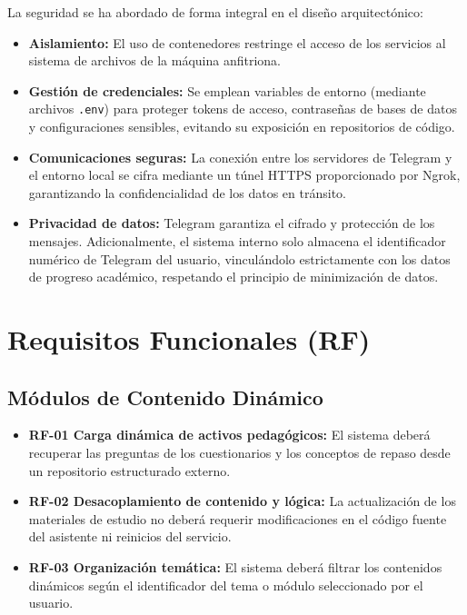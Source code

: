 \documentclass[a4paper,12pt,twoside,final]{book}
\begin{document}
La seguridad se ha abordado de forma integral en el diseño arquitectónico:
\begin{itemize}
    \item \textbf{Aislamiento:} El uso de contenedores restringe el acceso de los servicios al sistema de archivos de la máquina anfitriona.
    \item \textbf{Gestión de credenciales:} Se emplean variables de entorno (mediante archivos \texttt{.env}) para proteger tokens de acceso, contraseñas de bases de datos y configuraciones sensibles, evitando su exposición en repositorios de código.
    \item \textbf{Comunicaciones seguras:} La conexión entre los servidores de Telegram y el entorno local se cifra mediante un túnel HTTPS proporcionado por Ngrok, garantizando la confidencialidad de los datos en tránsito.
    \item \textbf{Privacidad de datos:} Telegram garantiza el cifrado y protección de los mensajes. Adicionalmente, el sistema interno solo almacena el identificador numérico de Telegram del usuario, vinculándolo estrictamente con los datos de progreso académico, respetando el principio de minimización de datos.
\end{itemize}

\section{Requisitos Funcionales (RF)}

\subsection{Módulos de Contenido Dinámico}
\begin{itemize}
    \item \textbf{RF-01 Carga dinámica de activos pedagógicos:} El sistema deberá recuperar las preguntas de los cuestionarios y los conceptos de repaso desde un repositorio estructurado externo.
    \item \textbf{RF-02 Desacoplamiento de contenido y lógica:} La actualización de los materiales de estudio no deberá requerir modificaciones en el código fuente del asistente ni reinicios del servicio.
    \item \textbf{RF-03 Organización temática:} El sistema deberá filtrar los contenidos dinámicos según el identificador del tema o módulo seleccionado por el usuario.
\end{itemize}
\end{document}
